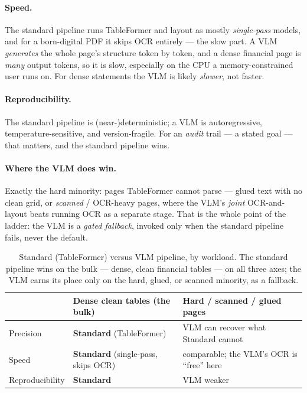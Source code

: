 \documentclass[11pt,a4paper]{report}
\begin{document}
\paragraph{Speed.} The standard pipeline runs TableFormer and layout as mostly \emph{single-pass} models, and
for a born-digital PDF it skips OCR entirely --- the slow part. A VLM \emph{generates} the whole page's
structure token by token, and a dense financial page is \emph{many} output tokens, so it is slow, especially
on the CPU a memory-constrained user runs on. For dense statements the VLM is likely \emph{slower}, not faster.

\paragraph{Reproducibility.} The standard pipeline is (near-)deterministic; a VLM is autoregressive,
temperature-sensitive, and version-fragile. For an \emph{audit} trail --- a stated goal --- that matters, and
the standard pipeline wins.

\paragraph{Where the VLM does win.} Exactly the hard minority: pages TableFormer cannot parse --- glued text
with no clean grid, or \emph{scanned} / OCR-heavy pages, where the VLM's \emph{joint} OCR-and-layout beats
running OCR as a separate stage. That is the whole point of the ladder: the VLM is a \emph{gated fallback},
invoked only when the standard pipeline fails, never the default.

\begin{table}[h]
\centering
\small
\caption{Standard (TableFormer) versus VLM pipeline, by workload. The standard pipeline wins on the bulk ---
dense, clean financial tables --- on all three axes; the VLM earns its place only on the hard, glued, or
scanned minority, as a fallback.}
\label{tab:standard-vs-vlm}
\begin{tabular}{@{}lll@{}}
\toprule
 & \textbf{Dense clean tables (the bulk)} & \textbf{Hard / scanned / glued pages} \\
\midrule
Precision        & \textbf{Standard} (TableFormer)            & VLM can recover what Standard cannot \\
Speed            & \textbf{Standard} (single-pass, skips OCR) & comparable; the VLM's OCR is ``free'' here \\
Reproducibility  & \textbf{Standard}                          & VLM weaker \\
\bottomrule
\end{tabular}
\end{table}
\end{document}
